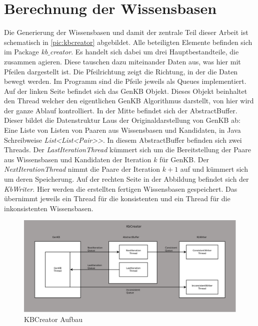 \documentclass[12pt,a4paper]{article}
\begin{document}
\section{Berechnung der Wissensbasen}
\label{sec:kbcreator} %






Die Generierung der Wissensbasen und damit der zentrale Teil dieser Arbeit ist schematisch in \autoref{pic:kbcreator} abgebildet. Alle beteiligten Elemente befinden sich im Package \textit{kb$\_$creator}. Es handelt sich dabei um drei Hauptbestandteile, die zusammen agieren. Diese tauschen dazu miteinander Daten aus, was hier mit Pfeilen dargestellt ist. Die Pfeilrichtung zeigt die Richtung, in der die Daten bewegt werden. Im Programm sind die Pfeile jeweils als Queues implementiert. Auf der linken  Seite befindet sich das GenKB Objekt. Dieses Objekt beinhaltet den Thread welcher den eigentlichen GenKB Algorithmus darstellt, von hier wird der ganze Ablauf kontrolliert. In der Mitte befindet sich der AbstractBuffer. Dieser bildet die Datenstruktur \glqq L\grqq \space aus der Originaldarstellung von GenKB ab: Eine Liste von Listen von Paaren aus Wissensbasen und Kandidaten, in Java Schreibweise \textit{List<List<Pair>>}. In diesem AbstractBuffer befinden sich zwei Threads. Der \textit{LastIterationThread} kümmert sich um die Bereitstellung der Paare aus Wissensbasen und Kandidaten der Iteration $k$ für GenKB. Der \textit {NextIterationThread} nimmt die Paare der Iteration $k+1$ auf und kümmert sich um deren Speicherung. Auf der rechten Seite in der Abbildung befindet sich der \textit{KbWriter}. Hier werden die erstellten fertigen Wissensbasen gespeichert. Das übernimmt jeweils ein Thread für die konsistenten und ein Thread für die inkonsistenten Wissensbasen. 


\begin{figure}
\includegraphics[width=1\linewidth]{bilder/kbcreator.png}
\caption{KBCreator Aufbau}
\label{pic:kbcreator}
\end{figure}
\end{document}
